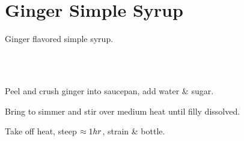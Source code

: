 \section{Ginger Simple Syrup}\label{gingerSyrup}

\begin{recipestats}[
        servings=$\onehalf~C$,
        preptime=5~\minute,
        original=\citefield{alohaKitchen}{shorttitle}~\cite{alohaKitchen},
    ]
\end{recipestats}

\begin{recipeabstract}
    Ginger flavored simple syrup.
\end{recipeabstract}

\begin{ingredientcolumns}[1]
    \begin{ingredientblock}
        \\
        \\
    \end{ingredientblock}
\end{ingredientcolumns}

\begin{preparation}
\item Peel and crush ginger into saucepan, add water \& sugar.
\item Bring to simmer and stir over medium heat until filly dissolved.
\item Take off heat, steep $\approx 1 \hour$, strain \& bottle.
\end{preparation}

\recipeend%

